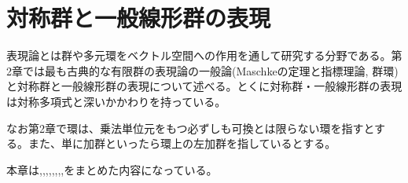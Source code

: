 \documentclass{ltjsreport}
\begin{document}
\chapter{対称群と一般線形群の表現}

表現論とは群や多元環をベクトル空間への作用を通して研究する分野である。第2章では最も古典的な有限群の表現論の一般論(Maschkeの定理と指標理論, 群環)と対称群と一般線形群の表現について述べる。とくに対称群・一般線形群の表現は対称多項式と深いかかわりを持っている。

なお第2章で環は、乗法単位元をもつ必ずしも可換とは限らない環を指すとする。また、単に加群といったら環上の左加群を指しているとする。

本章は\cite{tensor_alg_and_rep},\cite{alg_2},\cite{homological},\cite{young_tableau},\cite{serre},\cite{fulton_harris},\cite{adv_alg},\cite{macdonald},\cite{sym_func}をまとめた内容になっている。



\newpage



\newpage


\newpage

\end{document}
